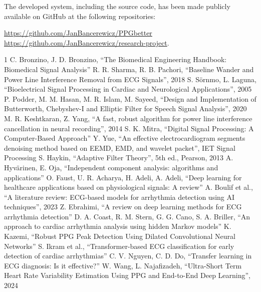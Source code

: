 \documentclass[journal]{IEEEtran}
\begin{document}
\newpage

The developed system, including the source code, has been made publicly available on GitHub at the following repositories:

\noindent
\href{https://github.com/JanBancerewicz/PPGbetter}{https://github.com/JanBancerewicz/PPGbetter}
\href{https://github.com/JanBancerewicz/research-project}{https://github.com/JanBancerewicz/research-project}.


 

\begin{thebibliography}{1}
C. Bronzino, J. D. Bronzino, “The Biomedical Engineering Handbook: Biomedical Signal Analysis”
R. R. Sharma, R. B. Pachori, “Baseline Wander and Power Line Interference Removal from ECG Signals”, 2018
S. Sörnmo, L. Laguna, “Bioelectrical Signal Processing in Cardiac and Neurological Applications”, 2005
P. Podder, M. M. Hasan, M. R. Islam, M. Sayeed, “Design and Implementation of Butterworth, Chebyshev-I and Elliptic Filter for Speech Signal Analysis”, 2020
M. R. Keshtkaran, Z. Yang, “A fast, robust algorithm for power line interference cancellation in neural recording”, 2014
S. K. Mitra, “Digital Signal Processing: A Computer-Based Approach”
Y. Yue, “An effective electrocardiogram segments denoising method based on EEMD, EMD, and wavelet packet”, IET Signal Processing
S. Haykin, “Adaptive Filter Theory”, 5th ed., Pearson, 2013
A. Hyvärinen, E. Oja, “Independent component analysis: algorithms and applications”
O. Faust, U. R. Acharya, H. Adeli, A. Adeli, “Deep learning for healthcare applications based on physiological signals: A review”
A. Boulif et al., “A literature review: ECG-based models for arrhythmia detection using AI techniques”, 2023
Z. Ebrahimi, “A review on deep learning methods for ECG arrhythmia detection”
D. A. Coast, R. M. Stern, G. G. Cano, S. A. Briller, “An approach to cardiac arrhythmia analysis using hidden Markov models”
K. Kazemi, “Robust PPG Peak Detection Using Dilated Convolutional Neural Networks”
S. Ikram et al., “Transformer-based ECG classification for early detection of cardiac arrhythmias”
C. V. Nguyen, C. D. Do, “Transfer learning in ECG diagnosis: Is it effective?”
W. Wang, L. Najafizadeh, “Ultra-Short Term Heart Rate Variability Estimation Using PPG and End-to-End Deep Learning”, 2024

\end{thebibliography}
\end{document}
